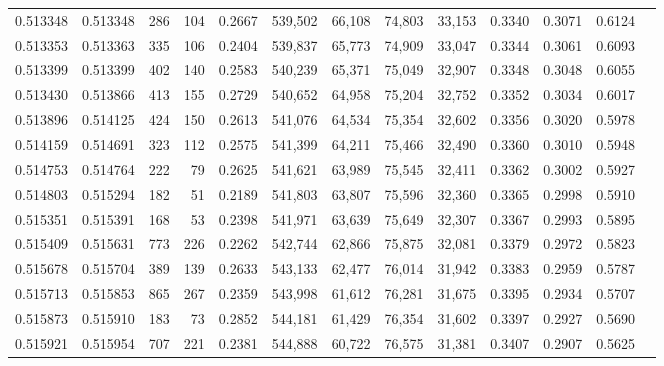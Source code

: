 \begin{tabular}{rrrrrrrrrrrrr}
0.513348 & 0.513348 &   286 &   104 &                                     0.2667 & 539,502 &  66,108 &  74,803 &  33,153 & 0.3340 & 0.3071 & 0.6124 \\
0.513353 & 0.513363 &   335 &   106 &                                     0.2404 & 539,837 &  65,773 &  74,909 &  33,047 & 0.3344 & 0.3061 & 0.6093 \\
0.513399 & 0.513399 &   402 &   140 &                                     0.2583 & 540,239 &  65,371 &  75,049 &  32,907 & 0.3348 & 0.3048 & 0.6055 \\
0.513430 & 0.513866 &   413 &   155 &                                     0.2729 & 540,652 &  64,958 &  75,204 &  32,752 & 0.3352 & 0.3034 & 0.6017 \\
0.513896 & 0.514125 &   424 &   150 &                                     0.2613 & 541,076 &  64,534 &  75,354 &  32,602 & 0.3356 & 0.3020 & 0.5978 \\
0.514159 & 0.514691 &   323 &   112 &                                     0.2575 & 541,399 &  64,211 &  75,466 &  32,490 & 0.3360 & 0.3010 & 0.5948 \\
0.514753 & 0.514764 &   222 &    79 &                                     0.2625 & 541,621 &  63,989 &  75,545 &  32,411 & 0.3362 & 0.3002 & 0.5927 \\
0.514803 & 0.515294 &   182 &    51 &                                     0.2189 & 541,803 &  63,807 &  75,596 &  32,360 & 0.3365 & 0.2998 & 0.5910 \\
0.515351 & 0.515391 &   168 &    53 &                                     0.2398 & 541,971 &  63,639 &  75,649 &  32,307 & 0.3367 & 0.2993 & 0.5895 \\
0.515409 & 0.515631 &   773 &   226 &                                     0.2262 & 542,744 &  62,866 &  75,875 &  32,081 & 0.3379 & 0.2972 & 0.5823 \\
0.515678 & 0.515704 &   389 &   139 &                                     0.2633 & 543,133 &  62,477 &  76,014 &  31,942 & 0.3383 & 0.2959 & 0.5787 \\
0.515713 & 0.515853 &   865 &   267 &                                     0.2359 & 543,998 &  61,612 &  76,281 &  31,675 & 0.3395 & 0.2934 & 0.5707 \\
0.515873 & 0.515910 &   183 &    73 &                                     0.2852 & 544,181 &  61,429 &  76,354 &  31,602 & 0.3397 & 0.2927 & 0.5690 \\
0.515921 & 0.515954 &   707 &   221 &                                     0.2381 & 544,888 &  60,722 &  76,575 &  31,381 & 0.3407 & 0.2907 & 0.5625 \\

\end{tabular}

